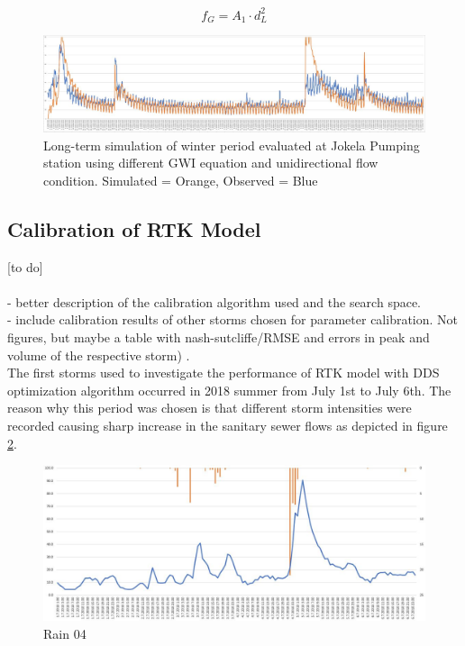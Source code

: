 \begin{equation}
\label{eqn:dfeqmod}
f_G = A_1 \cdot d^2_L
\end{equation}

\begin{figure}[h]
    \centering
	\includegraphics[scale=0.45]{figures/result_pb_non_forcheimer.JPG}
	\caption{Long-term simulation of winter period evaluated at Jokela Pumping station using different GWI equation and unidirectional flow condition. Simulated = Orange, Observed = Blue}
	\label{fig:result_pb_nondupuit}
\end{figure}



\subsection{Calibration of RTK Model}
[to do]\\ \\
- better description of the calibration algorithm used and the search space.\\
- include calibration results of other storms chosen for parameter calibration. Not figures, but maybe a table with nash-sutcliffe/RMSE and errors in peak and volume of the respective storm) .\\

The first storms used to investigate the performance of RTK model with DDS optimization algorithm occurred in 2018 summer from July 1st to July 6th. The reason why this period was chosen is that different storm intensities were recorded causing sharp increase in the sanitary sewer flows as depicted in figure \ref{fig:rain04}. 

\begin{figure}[h]
    \centering
	\includegraphics[scale=0.45]{figures/rain04.JPG}
	\caption{Rain 04}
	\label{fig:rain04}
\end{figure}

